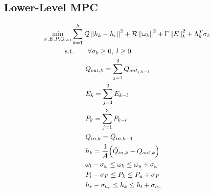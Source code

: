 \subsection{Lower-Level MPC}
	\begin{subequations}\label{P2:FinalModel}
		\begin{align}
			\underset{\omega, E, P, Q_{\text{out}}}{\text{min}}& \sum_{k=1}^{h} \mathcal{Q} \left\lVert h_k - h_r \right\rVert^2 + \mathcal{R} \left\lVert \omega_k \right\rVert^2 + \Gamma \left\lVert E \right\rVert^{2}_{k} + \Lambda_k^T \sigma_k  \label{P1:lower_mpc} \\
			&\hspace{-1em} \text{s.t.}  \quad \quad \forall \sigma_k \geq 0, \; l \geq 0 \label{P1:1} \\
			& \qquad Q_{\text{out}, k} = \sum_{j=1}^3 Q_{out_{j,k-1}} \label{P1:2} \\
			& \qquad E_{k} = \sum_{j=1}^3 E_{k-l} \label{P1:3}  \\
			& \qquad P_{k} = \sum_{j=1}^3 P_{k-l} \label{P1:4}  \\
			& \qquad Q_{in,k} = \tilde{Q}_{in,k-1} \label{P1:5}  \\
			& \qquad h_k = \frac{1}{A} \Big(\tilde{Q}_{in,k} - Q_{out,k}\Big) \label{P1:6} \\
			& \qquad \omega_{l} - \sigma_{\omega} \leq \omega_k \leq \omega_{u} + \sigma_{\omega} \label{P1:7} \\
			& \qquad P_{l} - \sigma_{P} \leq P_k \leq P_{u} + \sigma_{P} \label{P1:8} \\
			& \qquad h_{r} - \sigma_{h_{r}} \leq h_k \leq h_{l} + \sigma_{h_{r}} \label{P1:9}
	\end{align}
	\end{subequations}
